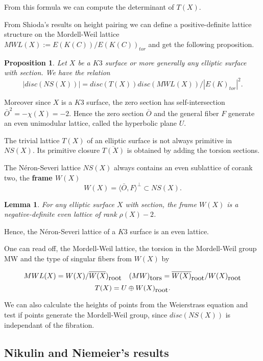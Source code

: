 \documentclass{amsart}
\newtheorem{lem}{Lemma}
\newtheorem{proposition}{Proposition}
\begin{document}
From this formula we can compute the determinant of $T(X)$.

From Shioda's results on height pairing \cite{Shio} we can define a positive-definite lattice structure on the Mordell-Weil lattice $MWL(X):=E(K(C))/E(K(C))_{tor}$ and get the following proposition.


\begin{proposition}
Let $X$ be a $K3$ surface or more generally any elliptic surface with section. 
We have the relation
\[
|disc(NS(X))| = disc(T(X)) disc( MWL(X))/|E(K)_{tor}|^2.
\]
\end{proposition}  

\bigskip





Moreover since $X$ is a $K3$ surface, the zero section has self-intersection $\bar{O}^2=-\chi (X)=-2$. Hence the zero section $\bar{O}$  and the general fiber $F$ generate an even unimodular lattice, called the hyperbolic plane $U$. 

The trivial lattice $T(X)$ of an elliptic surface is not always primitive in $NS(X)$. Its primitive closure $\overline{T(X)}$ is obtained by adding the torsion sections.


The N\'eron-Severi lattice $NS(X)$ always contains an even sublattice of corank two, the {\bf{ frame $W(X)$}}
$$W(X)=\langle \bar{O},F \rangle ^{\perp} \subset NS(X).$$


\begin{lem}
For any elliptic surface $X$ with section, the frame $W(X)$ is a negative-definite even lattice of rank $\rho (X) -2$.
\end{lem}

Hence, the N\'eron-Severi lattice of a $K3$ surface is an even lattice.

One can read off, the Mordell-Weil lattice, the torsion in the Mordell-Weil group MW and the type of singular fibers from $W(X)$ by

$$MWL(X)=W(X)/{\overline{W(X})_{\hbox{root}}}\,\,\,\,\,\,(MW)_{\hbox{tors}}=\overline{W(X)}_{\hbox{root}}/W(X)_{\hbox{root}}$$ 
$$T(X)=U\oplus W(X)_{\hbox{root}}.$$


We can also calculate the heights of points from the Weierstrass equation \cite{Ku} and test if points generate the Mordell-Weil group, since $disc (NS(X))$ is independant of the fibration.



\subsection{Nikulin and Niemeier's results}
\end{document}
